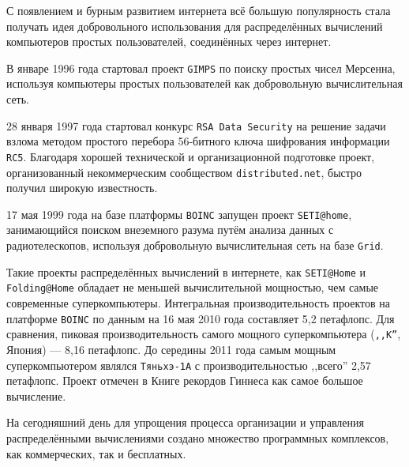 \documentclass[a4paper,12pt,titlepage,pdftex,headsepline]{scrartcl}
\begin{document}
С появлением и бурным развитием интернета всё большую популярность стала получать идея добровольного использования для распределённых вычислений компьютеров простых пользователей, соединённых через интернет.

В январе 1996 года стартовал проект \texttt{GIMPS} по поиску простых чисел Мерсенна, используя компьютеры простых пользователей как добровольную вычислительная сеть.

28 января 1997 года стартовал конкурс \texttt{RSA Data Security} на решение задачи взлома методом простого перебора 56-битного ключа шифрования информации \texttt{RC5}.
Благодаря хорошей технической и организационной подготовке проект, организованный некоммерческим сообществом \texttt{distributed.net}, быстро получил широкую известность.

17 мая 1999 года на базе платформы \texttt{BOINC} запущен проект \texttt{SETI@home}, занимающийся поиском внеземного разума путём анализа данных с радиотелескопов, используя добровольную вычислительная сеть на базе \texttt{Grid}.

Такие проекты распределённых вычислений в интернете, как \texttt{SETI@Home} и\\ \texttt{Folding@Home} обладает не меньшей вычислительной мощностью, чем самые современные суперкомпьютеры.
Интегральная производительность проектов на платформе \texttt{BOINC} по данным на 16 мая 2010 года составляет 5,2 петафлопс.
Для сравнения, пиковая производительность самого мощного суперкомпьютера (\texttt{,,K''}, Япония) --- 8,16 петафлопс.
До середины 2011 года самым мощным суперкомпьютером являлся \texttt{Тяньхэ-1А} с производительностью ,,всего'' 2,57 петафлопс.
Проект отмечен в Книге рекордов Гиннеса как самое большое вычисление.

На сегодняшний день для упрощения процесса организации и управления распределёнными вычислениями создано множество программных комплексов, как коммерческих, так и бесплатных.
\end{document}
